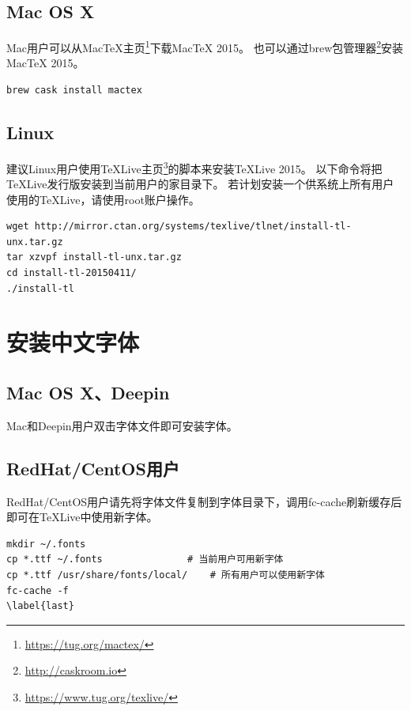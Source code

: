 \subsection{Mac OS X}

Mac用户可以从MacTeX主页\footnote{\url{https://tug.org/mactex/}}下载MacTeX 2015。
也可以通过brew包管理器\footnote{\url{http://caskroom.io}}安装MacTeX 2015。

\begin{lstlisting}[basicstyle=\small\ttfamily, numbers=none]
brew cask install mactex
\end{lstlisting}

\subsection{Linux}

建议Linux用户使用TeXLive主页\footnote{\url{https://www.tug.org/texlive/}}的脚本来安装TeXLive 2015。
以下命令将把TeXLive发行版安装到当前用户的家目录下。
若计划安装一个供系统上所有用户使用的TeXLive，请使用root账户操作。

\begin{lstlisting}[basicstyle=\small\ttfamily, numbers=none]
wget http://mirror.ctan.org/systems/texlive/tlnet/install-tl-unx.tar.gz
tar xzvpf install-tl-unx.tar.gz
cd install-tl-20150411/
./install-tl
\end{lstlisting}

\section{安装中文字体}

\subsection{Mac OS X、Deepin}

Mac和Deepin用户双击字体文件即可安装字体。

\clearpage
\subsection{RedHat/CentOS用户}

RedHat/CentOS用户请先将字体文件复制到字体目录下，调用fc-cache刷新缓存后即可在TeXLive中使用新字体。

\begin{lstlisting}[basicstyle=\small\ttfamily, numbers=none]
mkdir ~/.fonts
cp *.ttf ~/.fonts				# 当前用户可用新字体
cp *.ttf /usr/share/fonts/local/	# 所有用户可以使用新字体
fc-cache -f
\label{last}
\end{lstlisting}

